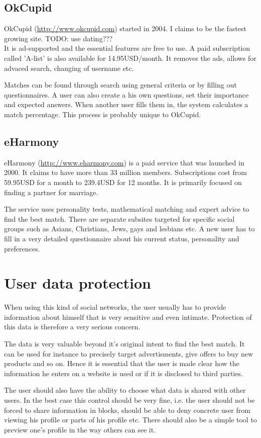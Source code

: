 \documentclass[11pt,draft,oneside]{fithesis}
\begin{document}
		\subsection{OkCupid}
		OkCupid (\url{http://www.okcupid.com}) started in 2004. I claims to be the fastest growing site. TODO: use dating???\\
		It is ad-supported and the essential features are free to use. A paid subscription called 'A-list' is also available for 14.95USD/month. It removes the ads, allows for advaced search, changing of username etc.
		
		Matches can be found through search using general criteria or by filling out questionnaires. A user can also create a his own questions, set their importance and expected answers. When another user fills them in, the system calculates a match percentage. This process is probably unique to OkCupid.\cite{website:okcupid}
		\subsection{eHarmony}
		eHarmony (\url{http://www.eharmony.com}) is a paid service that was launched in 2000. It claims to have more than 33 million members. Subscriptions cost from 59.95USD for a month  to 239.4USD for 12 months. It is primarily focused on finding a partner for marriage.
		
		The service uses personality tests, mathematical matching and expert advice to find the best match. There are separate subsites targeted for specific social groups such as Asians, Christians, Jews, gays and  lesbians etc. A new user has to fill in a very detailed questionnaire about his current status, personality and preferences.\cite{website:eharmony}
\section{User data protection}
	When using this kind of social networks, the user usually has to provide information about himself that is very sensitive and even intimate. Protection of this data is therefore a very serious concern.
	
	The data is very valuable beyond it's original intent to find the best match. It can be used for instance to precisely target advertisments, give offers to buy new products and so on. Hence it is essential that the user is made clear how the information he enters on a website is used or if it is disclosed to third parties.
	
	The user should also have the ability to choose what data is shared with other users. In the best case this control should be very fine, i.e. the user should not be forced to share information in blocks, should be able to deny concrete user from viewing his profile or parts of his profile etc. There should also be a simple tool to preview one's profile in the way others can see it.
	
\end{document}
